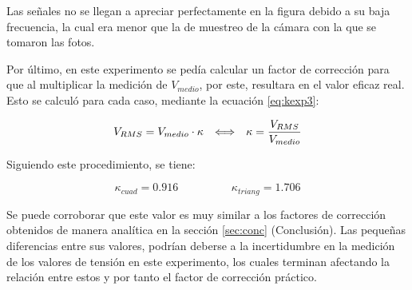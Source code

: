 Las señales no se llegan a apreciar perfectamente en la figura debido a su baja frecuencia, la cual era menor que la de muestreo de la cámara con la que se tomaron las fotos.


Por último, en este experimento se pedía calcular un factor de corrección para que al multiplicar la medición de $V_{medio}$, por este, resultara en el valor eficaz real. Esto se calculó para cada caso, mediante la ecuación \ref{eq:kexp3}:  

\begin{equation}
    \label{eq:kexp3}
    V_{RMS}=V_{medio}\cdot\kappa\llrah c\kappa=\frac{V_{RMS}}{V_{medio}}
\end{equation}

Siguiendo este procedimiento, se tiene:

\begin{equation*}
    \kappa_{cuad}= 0.916 
    \hspace{2cm}
    \kappa_{triang}= 1.706
\end{equation*}

Se puede corroborar que este valor es muy similar a los factores de corrección obtenidos de manera analítica en la sección \ref{sec:conc} (Conclusión). Las pequeñas diferencias entre sus valores, podrían deberse a la incertidumbre en la medición de los valores de tensión en este experimento, los cuales terminan afectando la relación entre estos y por tanto el factor de corrección práctico.
